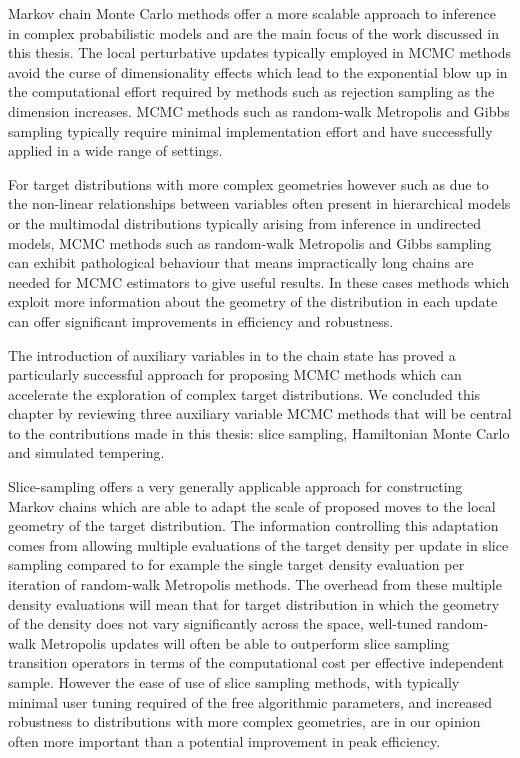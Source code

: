 Markov chain Monte Carlo methods offer a more scalable approach to inference in complex probabilistic models and are the main focus of the work discussed in this thesis. The local perturbative updates typically employed in \ac{MCMC} methods avoid the curse of dimensionality effects which lead to the exponential blow up in the computational effort required by methods such as rejection sampling as the dimension increases. \ac{MCMC} methods such as random-walk Metropolis and Gibbs sampling typically require minimal implementation effort and have successfully applied in a wide range of settings. %

For target distributions with more complex geometries however such as due to the non-linear relationships between variables often present in hierarchical models or the multimodal distributions typically arising from inference in undirected models, \ac{MCMC} methods such as random-walk Metropolis and Gibbs sampling can exhibit pathological behaviour that means impractically long chains are needed for \ac{MCMC} estimators to give useful results. In these cases methods which exploit more information about the geometry of the distribution in each update can offer significant improvements in efficiency and robustness.

The introduction of auxiliary variables in to the chain state has proved a particularly successful approach for proposing \ac{MCMC} methods which can accelerate the exploration of complex target distributions. We concluded this chapter by reviewing three auxiliary variable \ac{MCMC} methods that will be central to the contributions made in this thesis: slice sampling, Hamiltonian Monte Carlo and simulated tempering. 

Slice-sampling offers a very generally applicable approach for constructing Markov chains which are able to adapt the scale of proposed moves to the local geometry of the target distribution. The information controlling this adaptation comes from allowing multiple evaluations of the target density per update in slice sampling compared to for example the single target density evaluation per iteration of random-walk Metropolis methods. The overhead from these multiple density evaluations will mean that for target distribution in which the geometry of the density does not vary significantly across the space, well-tuned random-walk Metropolis updates will often be able to outperform slice sampling transition operators in terms of the computational cost per effective independent sample. However the ease of use of slice sampling methods, with typically minimal user tuning required of the free algorithmic parameters, and increased robustness to distributions with more complex geometries, are in our opinion often more important than a potential improvement in peak efficiency.

